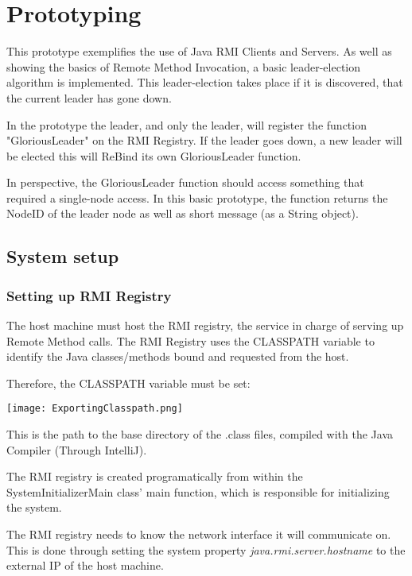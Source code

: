 \chapter{Prototyping}
This prototype exemplifies the use of Java RMI Clients and Servers. As well as showing the basics of Remote Method Invocation, a basic leader-election algorithm is implemented. This leader-election takes place if it is discovered, that the current leader has gone down.

In the prototype the leader, and only the leader, will register the function "GloriousLeader" on the RMI Registry. 
If the leader goes down, a new leader will be elected this will ReBind its own GloriousLeader function.

In perspective, the GloriousLeader function should access something that required a single-node access. In this basic prototype, the function returns the NodeID of the leader node as well as short message (as a String object).

\section{System setup}
\subsection{Setting up RMI Registry}
The host machine must host the RMI registry, the service in charge of serving up Remote Method calls.
The RMI Registry uses the CLASSPATH variable to identify the Java classes/methods bound and requested from the host. 

Therefore, the CLASSPATH variable must be set:

\begin{center}
	\texttt{[image: ExportingClasspath.png]}
\end{center}

This is the path to the base directory of the .class files, compiled with the Java Compiler (Through IntelliJ).

The RMI registry is created programatically from within the SystemInitializerMain class' main function, which is responsible for initializing the system. 

The RMI registry needs to know the network interface it will communicate on. This is done through setting the system property \textit{java.rmi.server.hostname} to the external IP of the host machine. 


